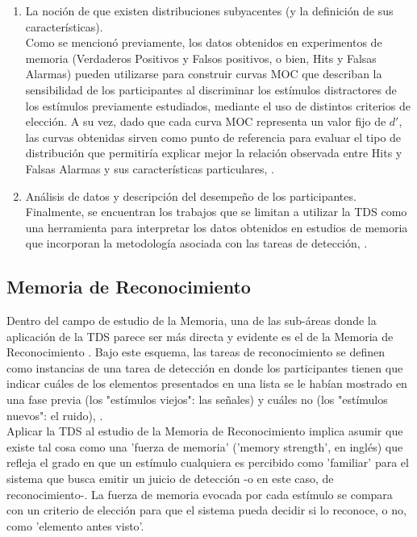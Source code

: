 \begin{enumerate}
\item La noción de que existen distribuciones subyacentes (y la definición de sus características).\\

Como se mencionó previamente, los datos obtenidos en experimentos de memoria (Verdaderos Positivos y Falsos positivos, o bien, Hits y Falsas Alarmas) pueden utilizarse para construir curvas MOC que describan la sensibilidad de los participantes al discriminar los estímulos distractores de los estímulos previamente estudiados, mediante el uso de distintos criterios de elección. A su vez, dado que cada curva MOC representa un valor fijo de $d'$, las curvas obtenidas sirven como punto de referencia para evaluar el tipo de distribución que permitiría explicar mejor la relación observada entre Hits y Falsas Alarmas y sus características particulares, \parencite{Kintsch1967, Ratcliff1992, Ratcliff1994}.\\

\item Análisis de datos y descripción del desempeño de los participantes.\\

Finalmente, se encuentran los trabajos que se limitan a utilizar la TDS como una herramienta para interpretar los datos obtenidos en estudios de memoria que incorporan la metodología asociada con las tareas de detección, \parencite{Marks1964, Wickelgren1966_Solo, Schulman1967}.\\
\end{enumerate} 

\subsection{ Memoria de Reconocimiento}

Dentro del campo de estudio de la Memoria, una de las sub-áreas donde la aplicación de la TDS parece ser más directa y evidente es el de la Memoria de Reconocimiento \parencite{Parks1966}. Bajo este esquema, las tareas de reconocimiento se definen como instancias de una tarea de detección en donde los participantes tienen que indicar cuáles de los elementos presentados en una lista se le habían mostrado en una fase previa (los "estímulos viejos": las señales) y cuáles no (los "estímulos nuevos": el ruido), \parencite{Bernbach1967, Kintsch1967}.\\

Aplicar la TDS al estudio de la Memoria de Reconocimiento implica asumir que existe tal cosa como una 'fuerza de memoria' ('memory strength', en inglés) que refleja el grado en que un estímulo cualquiera es percibido como 'familiar' para el sistema que busca emitir un juicio de detección -o en este caso, de reconocimiento-. La fuerza de memoria evocada por cada estímulo se compara con un criterio de elección para que el sistema pueda decidir si lo reconoce, o no, como 'elemento antes visto'.\\ 

